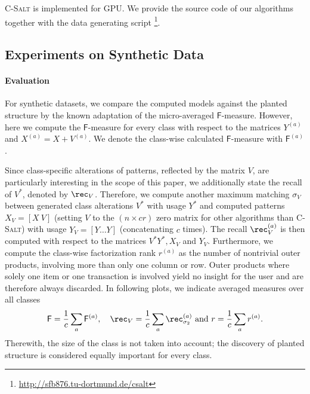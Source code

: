 \textsc{C-Salt} is implemented for GPU. We provide the source code of our algorithms together with the data generating script \footnote{\url{http://sfb876.tu-dortmund.de/csalt}}.
\subsection{Experiments on Synthetic Data}\label{sec:CS:synthExp}
\paragraph{Evaluation}
For synthetic datasets, we compare the computed models against the planted structure by the known adaptation of the micro-averaged $\mathsf{F}$-measure. However, here we compute the $\mathsf{F}$-measure for every class with respect to the matrices $Y^{(a)}$ and $X^{(a)}=X+V^{(a)}$. We denote the class-wise calculated $\mathsf{F}$-measure with $\mathsf{F}^{(a)}$.

Since class-specific alterations of patterns, reflected by the matrix $V$, are particularly interesting in the scope of this paper, we additionally state the recall of $V^*$, denoted by $\rec_V$. Therefore, we compute another maximum matching $\sigma_V$ between generated class alterations $V^*$ with usage $Y^*$ and computed patterns $X_V=[X\ V]$ (setting $V$ to the $(n\times cr)$ zero matrix for other algorithms than \textsc{C-Salt}) with usage $Y_V=[Y \ldots Y]$ (concatenating $c$ times). The recall $\rec_V^{(a)}$ is then computed with respect to the matrices $V^* Y^*, X_V$ and $Y_V$.
Furthermore, we compute the class-wise factorization rank $r^{(a)}$ as the number of nontrivial outer products, involving more than only one column or row. Outer products where solely one item or one transaction is involved yield no insight for the user and are therefore always discarded. In following plots, we indicate averaged measures over all classes
\[ \mathsf{F}=\frac{1}{c}\sum_a \mathsf{F}^{(a)}, \quad \rec_V=\frac{1}{c}\sum_a \rec^{(a)}_{\sigma_2} \text{ and } r=\frac{1}{c}\sum_a r^{(a)}.
\]
Therewith, the size of the class is not taken into account; the discovery of planted structure is considered equally important for every class.

